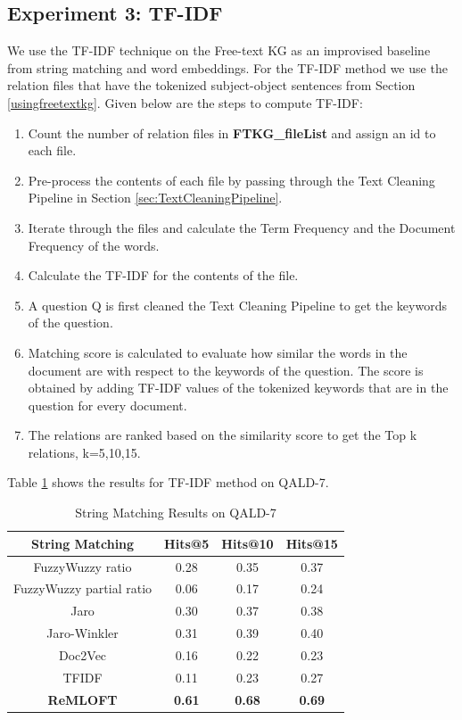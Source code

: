 \subsection{Experiment 3: TF-IDF}
We use the TF-IDF technique on the Free-text KG as an improvised baseline from string matching and word embeddings. For the TF-IDF method we use the relation files that have the tokenized subject-object sentences from Section \ref{usingfreetextkg}. Given below are the steps to compute TF-IDF:
\begin{enumerate}
    \item Count the number of relation files in \textbf{FTKG\_fileList} and assign an id to each file.
    \item Pre-process the contents of each file by passing through the Text Cleaning Pipeline in Section \ref{sec:TextCleaningPipeline}.
    \item Iterate through the files and calculate the Term Frequency and the Document Frequency of the words.
    \item Calculate the TF-IDF for the contents of the file.
    \item A question Q is first cleaned the Text Cleaning Pipeline to get the keywords of the question. 
    \item Matching score is calculated to evaluate how similar the words in the document are with respect to the keywords of the question. The score is obtained by adding TF-IDF values of the tokenized keywords that are in the question for every document.
    \item The relations are ranked based on the similarity score to get the Top k relations, k=5,10,15.
\end{enumerate}
Table \ref{tab:stringmatchingqald7} shows the results for TF-IDF method on QALD-7.

\begin{table}[H]
    \centering
    \begin{tabular}{|c|c|c|c|}
     \hline
     \textbf{String Matching} & \textbf{Hits@5} & \textbf{Hits@10} & \textbf{Hits@15}  \\
    \hline
     FuzzyWuzzy ratio & 0.28 & 0.35	& 0.37 \\
    \hline
    FuzzyWuzzy partial ratio & 0.06 & 0.17 & 0.24 \\
    \hline
        Jaro  & 0.30 & 0.37	& 0.38 \\
    \hline
        Jaro-Winkler & 0.31 & 0.39 &0.40 \\
    \hline
        Doc2Vec & 0.16 & 0.22 & 0.23 \\
    \hline
        TFIDF & 0.11 & 0.23 & 0.27 \\
    \hline
        \textbf{ReMLOFT} & \textbf{0.61} & \textbf{0.68} & \textbf{0.69} \\
    \hline
    \end{tabular}
    \caption{String Matching Results on QALD-7}
    \label{tab:stringmatchingqald7}
\end{table}

